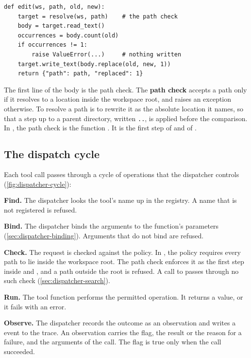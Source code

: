 \begin{lstlisting}[float=tbp, basicstyle=\ttfamily\footnotesize, caption={Illustrative code: an excerpt of the function \demoref{edit} that the dispatcher runs.}, label=lst:dispatcher-edit]
def edit(ws, path, old, new):
    target = resolve(ws, path)    # the path check
    body = target.read_text()
    occurrences = body.count(old)
    if occurrences != 1:
        raise ValueError(...)     # nothing written
    target.write_text(body.replace(old, new, 1))
    return {"path": path, "replaced": 1}
\end{lstlisting}

The first line of the body is the path check. The \textbf{path check} accepts a path only if it
resolves to a location inside the workspace root, and raises an exception otherwise. To resolve a
path is to rewrite it as the absolute location it names, so that a step up to a parent directory,
written \texttt{..}, is applied before the comparison. In \msa{}, the path check is the function
. It is the first step of  and of .

\subsection{The dispatch cycle}
\label{sec:dispatcher-cycle}

Each tool call passes through a cycle of operations that the dispatcher controls
(\cref{fig:dispatcher-cycle}):
\be
\item \textbf{Find.} The dispatcher looks the tool's name up in the registry. A name that is not
registered is refused.
\item \textbf{Bind.} The dispatcher binds the arguments to the function's parameters
(\cref{sec:dispatcher-binding}). Arguments that do not bind are refused.
\item \textbf{Check.} The request is checked against the policy. In \msa{}, the policy requires
every path to lie inside the workspace root. The path check enforces it as the first step inside
 and , and a path outside the root is refused. A call to
 passes through no such check (\cref{sec:dispatcher-search}).
\item \textbf{Run.} The tool function performs the permitted operation. It returns a value, or it
fails with an error.
\item \textbf{Observe.} The dispatcher records the outcome as an observation and writes a
 event to the trace. An observation carries the  flag, the result
or the reason for a failure, and the arguments of the call. The  flag is true only when
the call succeeded.
\ee


